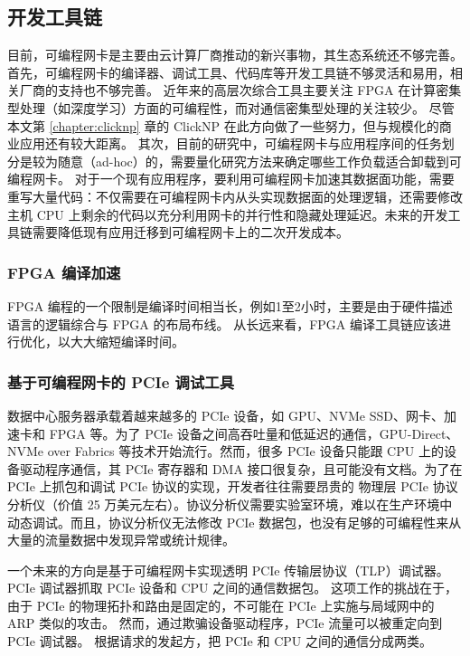 \subsection{开发工具链}
\label{future:toolchain}

目前，可编程网卡是主要由云计算厂商推动的新兴事物，其生态系统还不够完善。
首先，可编程网卡的编译器、调试工具、代码库等开发工具链不够灵活和易用，相关厂商的支持也不够完善。
近年来的高层次综合工具主要关注 FPGA 在计算密集型处理（如深度学习）方面的可编程性，而对通信密集型处理的关注较少。
尽管本文第 \ref{chapter:clicknp} 章的 ClickNP 在此方向做了一些努力，但与规模化的商业应用还有较大距离。
其次，目前的研究中，可编程网卡与应用程序间的任务划分是较为随意（ad-hoc）的，需要量化研究方法来确定哪些工作负载适合卸载到可编程网卡。
对于一个现有应用程序，要利用可编程网卡加速其数据面功能，需要重写大量代码：不仅需要在可编程网卡内从头实现数据面的处理逻辑，还需要修改主机 CPU 上剩余的代码以充分利用网卡的并行性和隐藏处理延迟。未来的开发工具链需要降低现有应用迁移到可编程网卡上的二次开发成本。



\subsubsection{FPGA 编译加速}
\label{future:fpga-compile}

FPGA 编程的一个限制是编译时间相当长，例如1至2小时，主要是由于硬件描述语言的逻辑综合与 FPGA 的布局布线。
从长远来看，FPGA 编译工具链应该进行优化，以大大缩短编译时间。


\subsubsection{基于可编程网卡的 PCIe 调试工具}
\label{future:pcie-debugger}

数据中心服务器承载着越来越多的 PCIe 设备，如 GPU、NVMe SSD、网卡、加速卡和 FPGA 等。为了 PCIe 设备之间高吞吐量和低延迟的通信，GPU-Direct、NVMe over Fabrics 等技术开始流行。然而，很多 PCIe 设备只能跟 CPU 上的设备驱动程序通信，其 PCIe 寄存器和 DMA 接口很复杂，且可能没有文档。为了在 PCIe 上抓包和调试 PCIe 协议的实现，开发者往往需要昂贵的 物理层 PCIe 协议分析仪（价值 25 万美元左右）。协议分析仪需要实验室环境，难以在生产环境中动态调试。而且，协议分析仪无法修改 PCIe 数据包，也没有足够的可编程性来从大量的流量数据中发现异常或统计规律。

一个未来的方向是基于可编程网卡实现透明 PCIe 传输层协议（TLP）调试器。PCIe 调试器抓取 PCIe 设备和 CPU 之间的通信数据包。
这项工作的挑战在于，由于 PCIe 的物理拓扑和路由是固定的，不可能在 PCIe 上实施与局域网中的 ARP 类似的攻击。
然而，通过欺骗设备驱动程序，PCIe 流量可以被重定向到 PCIe 调试器。
根据请求的发起方，把 PCIe 和 CPU 之间的通信分成两类。

